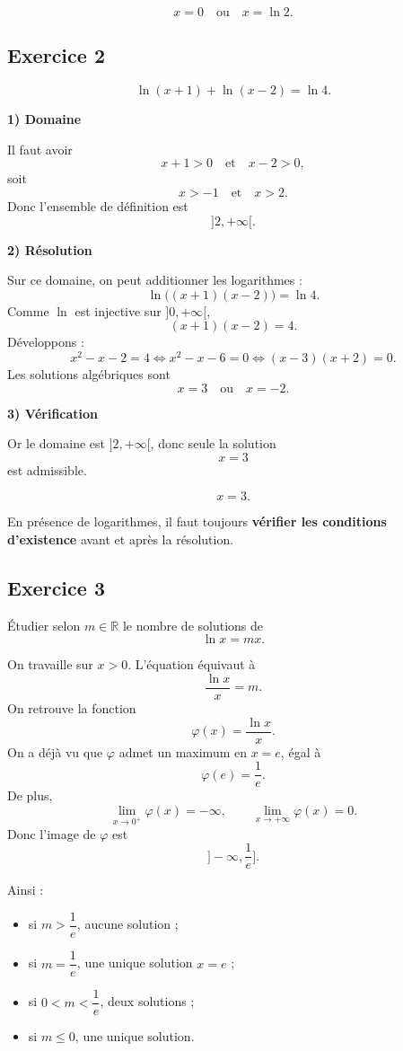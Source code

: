 \documentclass[11pt,a4paper]{article}
\newcommand{\R}{\mathbb{R}}
\begin{document}
\[
\boxed{x=0 \quad \text{ou} \quad x=\ln 2.}
\]

\subsection*{Exercice 2}
\[
\ln(x+1)+\ln(x-2)=\ln 4.
\]

\textbf{1) Domaine}

Il faut avoir
\[
x+1>0 \quad \text{et} \quad x-2>0,
\]
soit
\[
x>-1 \quad \text{et} \quad x>2.
\]
Donc l'ensemble de définition est
\[
]2,+\infty[.
\]

\textbf{2) Résolution}

Sur ce domaine, on peut additionner les logarithmes :
\[
\ln\big((x+1)(x-2)\big)=\ln 4.
\]
Comme \(\ln\) est injective sur \(]0,+\infty[\),
\[
(x+1)(x-2)=4.
\]
Développons :
\[
x^2-x-2=4
\iff x^2-x-6=0
\iff (x-3)(x+2)=0.
\]
Les solutions algébriques sont
\[
x=3 \quad \text{ou} \quad x=-2.
\]

\textbf{3) Vérification}

Or le domaine est \(]2,+\infty[\), donc seule la solution
\[
x=3
\]
est admissible.

\[
\boxed{x=3.}
\]

\begin{logiquebox}
En présence de logarithmes, il faut toujours \textbf{vérifier les conditions d'existence} avant et après la résolution.
\end{logiquebox}

\subsection*{Exercice 3}
Étudier selon \(m\in\R\) le nombre de solutions de
\[
\ln x=mx.
\]

On travaille sur \(x>0\).  
L'équation équivaut à
\[
\frac{\ln x}{x}=m.
\]
On retrouve la fonction
\[
\varphi(x)=\frac{\ln x}{x}.
\]
On a déjà vu que \(\varphi\) admet un maximum en \(x=e\), égal à
\[
\varphi(e)=\frac1e.
\]
De plus,
\[
\lim_{x\to 0^+}\varphi(x)=-\infty,\qquad
\lim_{x\to+\infty}\varphi(x)=0.
\]
Donc l'image de \(\varphi\) est
\[
]-\infty,\frac1e].
\]

Ainsi :
\begin{itemize}
    \item si \(m>\dfrac1e\), aucune solution ;
    \item si \(m=\dfrac1e\), une unique solution \(x=e\) ;
    \item si \(0<m<\dfrac1e\), deux solutions ;
    \item si \(m\leq 0\), une unique solution.
\end{itemize}
\end{document}
